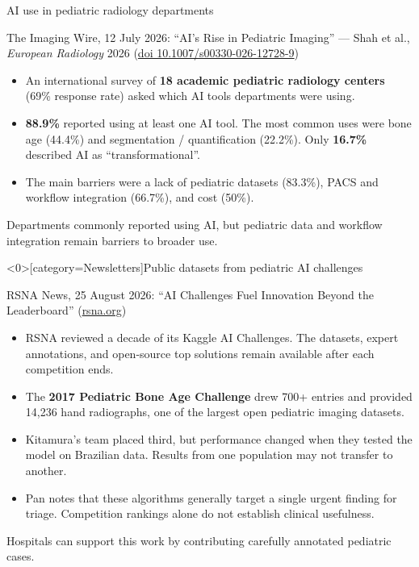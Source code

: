 \documentclass[aspectratio=169]{beamer}
\begin{document}
\begin{frame}[category=Newsletters]{AI use in pediatric radiology departments}
\relax
{\scriptsize The Imaging Wire, 12 July 2026: ``AI's Rise in Pediatric Imaging'' --- Shah et al., \textit{European Radiology} 2026
(\href{https://doi.org/10.1007/s00330-026-12728-9}{doi 10.1007/s00330-026-12728-9})\par}
\medskip
\small
\begin{itemize}
  \item An international survey of \textbf{18 academic pediatric radiology centers} (69\% response rate) asked which AI tools departments were using.
  \item \textbf{88.9\%} reported using at least one AI tool. The most common uses were bone age (44.4\%) and segmentation / quantification (22.2\%). Only \textbf{16.7\%} described AI as ``transformational''.
  \item The main barriers were a lack of pediatric datasets (83.3\%), PACS and workflow integration (66.7\%), and cost (50\%).
\end{itemize}
\medskip
Departments commonly reported using AI, but pediatric data and workflow integration remain barriers to broader use.
\end{frame}

\begin{frame}<0>[category=Newsletters]{Public datasets from pediatric AI challenges}
\relax
{\scriptsize RSNA News, 25 August 2026: ``AI Challenges Fuel Innovation Beyond the Leaderboard''
(\href{https://www.rsna.org/news/2026/august/ai-challenges-fuel-innovation}{rsna.org})\par}
\medskip
\small
\begin{itemize}
  \item RSNA reviewed a decade of its Kaggle AI Challenges. The datasets, expert annotations, and open-source top solutions remain available after each competition ends.
  \item The \textbf{2017 Pediatric Bone Age Challenge} drew 700+ entries and provided 14,236 hand radiographs, one of the largest open pediatric imaging datasets.
  \item Kitamura's team placed third, but performance changed when they tested the model on Brazilian data. Results from one population may not transfer to another.
  \item Pan notes that these algorithms generally target a single urgent finding for triage. Competition rankings alone do not establish clinical usefulness.
\end{itemize}
\medskip
Hospitals can support this work by contributing carefully annotated pediatric cases.
\end{frame}
\end{document}
